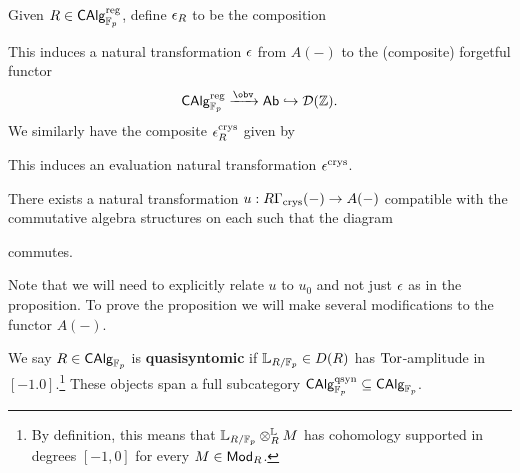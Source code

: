 \documentclass[11pt]{article}
\renewcommand{\L}{\mathbb{L}} %
\DeclareMathOperator{\qsyn}{qsyn} %
\begin{document}
Given $R\in\operatorname{\mathsf{CAlg}}_{\mathbb{F}_p}^{\operatorname{reg}}$, define $\epsilon_R$ to be the composition
\begin{center}
\end{center}
This induces a natural transformation $\epsilon$ from $A(-)$ to the (composite) forgetful functor 
$$\CAlg_{\F_p}^{\reg}\xto{\obv}\Ab\inj\D(\Z).$$ 
We similarly have the composite $\epsilon_R^{\operatorname{crys}}$ given by 
\begin{center}
\end{center}
This induces an evaluation natural transformation $\epsilon^{\operatorname{crys}}$.

\begin{proposition}
There exists a natural transformation $u: R\Gamma_{\operatorname{crys}}(-)\to A(-)$ compatible with the commutative algebra structures on each such that the diagram
\begin{center}
\end{center}
commutes.
\end{proposition}

Note that we will need to explicitly relate $u$ to $u_0$ and not just $\epsilon$ as in the proposition. To prove the proposition we will make several modifications to the functor $A(-)$.

\begin{definition}
We say $R\in\operatorname{\mathsf{CAlg}}_{\mathbb{F}_p}$ is \textbf{quasisyntomic} if $\L_{R/\F_p}\in D(R)$ has $\operatorname{Tor}$-amplitude in $[-1.0]$.\footnote{By definition, this means that $\L_{R/\F_p}\Ltensor_RM$ has cohomology supported in degrees $[-1,0]$ for every $M\in\operatorname{\mathsf{Mod}}_R$.} These objects span a full subcategory $\CAlg_{\F_p}^{\qsyn}\subset\CAlg_{\F_p}$.
\end{definition}
\end{document}
